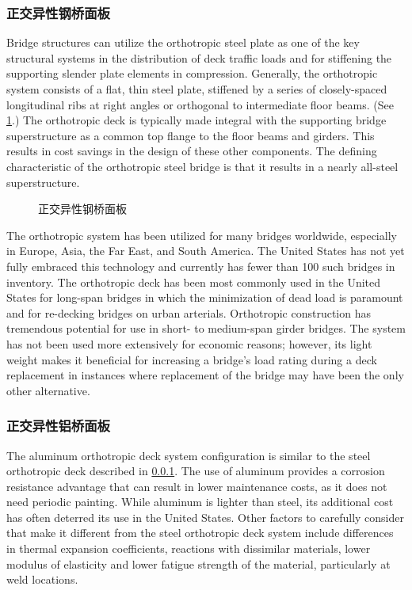 \subsubsection{正交异性钢桥面板}
\label{subsubsec:steel-orthotropic-deck}
Bridge structures can utilize the orthotropic steel plate as one of the key structural systems in the distribution of deck traffic loads and for stiffening the supporting slender plate elements in compression. Generally, the orthotropic system consists of a flat, thin steel plate, stiffened by a series of closely-spaced longitudinal ribs at right angles or orthogonal to intermediate floor beams. (See \cref{fig:orthotropic-steel-deck}.) The orthotropic deck is typically made integral with the supporting bridge superstructure as a common top flange to the floor beams and girders. This results in cost savings in the design of these other components. The defining characteristic of the orthotropic steel bridge is that it results in a nearly all-steel superstructure.

\begin{figure}
  \caption{正交异性钢桥面板}
  \label{fig:orthotropic-steel-deck}
\end{figure}

The orthotropic system has been utilized for many bridges worldwide, especially in Europe, Asia, the Far East, and South America. The United States has not yet fully embraced this technology and currently has fewer than 100 such bridges in inventory. The orthotropic deck has been most commonly used in the United States for long-span bridges in which the minimization of dead load is paramount and for re-decking bridges on urban arterials. Orthotropic construction has tremendous potential for use in short- to medium-span girder bridges. The system has not been used more extensively for economic reasons; however, its light weight makes it beneficial for increasing a bridge’s load rating during a deck replacement in instances where replacement of the bridge may have been the only other alternative.



\subsubsection{正交异性铝桥面板}
The aluminum orthotropic deck system configuration is similar to the steel orthotropic deck described in \cref{subsubsec:steel-orthotropic-deck}. The use of aluminum provides a corrosion resistance advantage that can result in lower maintenance costs, as it does not need periodic painting. While aluminum is lighter than steel, its additional cost has often deterred its use in the United States. Other factors to carefully consider that make it different from the steel orthotropic deck system include differences in thermal expansion coefficients, reactions with dissimilar materials, lower modulus of elasticity and lower fatigue strength of the material, particularly at weld locations.


